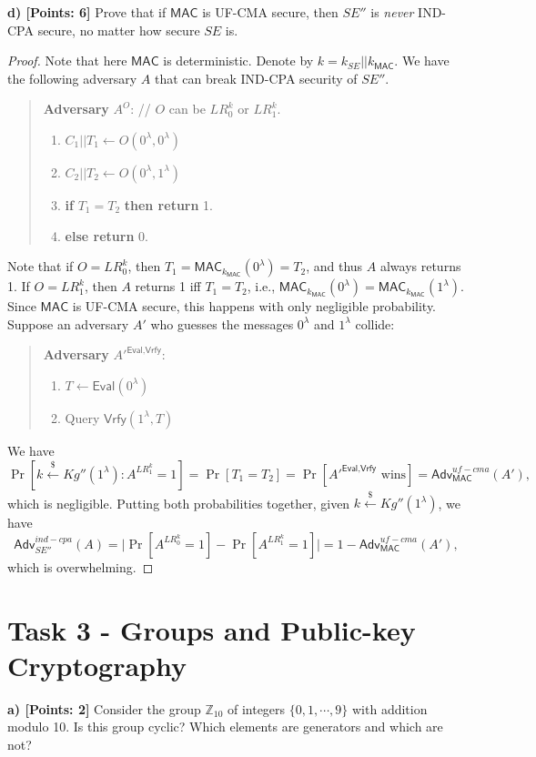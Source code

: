 \documentclass[12pt]{article}
\newcommand{\Z}{\mathbb{Z}}
\newcommand{\getsr}{\stackrel{\$}{\gets}}
\newcommand{\Adv}{\textsf{Adv}}
\newcommand{\MAC}{\textsf{MAC}}
\newcommand{\Eval}{\textsf{Eval}}
\newcommand{\Vrfy}{\textsf{Vrfy}}
\theoremstyle{definition}
\begin{document}
{\bf d) [Points: 6]} Prove that if $\MAC$ is UF-CMA secure, then $SE''$ is {\it never} IND-CPA secure, no matter how secure $SE$ is.
\begin{proof}
Note that here $\MAC$ is deterministic. Denote by $k = k_{SE}||k_{\MAC}$. We have the following adversary $A$ that can break IND-CPA security of $SE''$.
\begin{quote}
{\bf Adversary} $A^O$: // $O$ can be $LR_0^k$ or $LR_1^k$.
\begin{enumerate}
\item $C_1 || T_1 \gets O(0^\lambda, 0^\lambda)$
\item $C_2 || T_2 \gets O(0^\lambda, 1^\lambda)$
\item {\bf if} $T_1 = T_2$ {\bf then return} 1.
\item {\bf else return} 0.
\end{enumerate}
\end{quote}
Note that if $O = LR_0^k$, then $T_1 = \MAC_{k_{\MAC}}(0^\lambda) = T_2$, and thus $A$ always returns 1. If $O = LR_1^k$, then $A$ returns 1 iff $T_1 = T_2$, i.e., $\MAC_{k_{\MAC}}(0^\lambda) = \MAC_{k_{\MAC}}(1^\lambda)$. Since $\MAC$ is UF-CMA secure, this happens with only negligible probability. Suppose an adversary $A'$ who guesses the messages $0^\lambda$ and $1^\lambda$ collide:
\begin{quote}
{\bf Adversary} $A'^{\Eval, \Vrfy}$:
\begin{enumerate}
\item $T \gets \textsf{Eval}(0^\lambda)$
\item Query $\textsf{Vrfy}(1^\lambda, T)$
\end{enumerate}
\end{quote}
We have
$$\Pr[k \getsr Kg''(1^\lambda) : A^{LR_1^k}=1] = \Pr[T_1 = T_2] =  \Pr[\textrm{$A'^{\Eval, \Vrfy}$ wins}] = \Adv_{\MAC}^{uf-cma}(A'),$$
which is negligible. Putting both probabilities together, given $k \getsr Kg''(1^\lambda)$, we have 
$$\Adv_{SE''}^{ind-cpa}(A) = \bigg| \Pr[A^{LR_0^k}=1] -\Pr[A^{LR_1^k}=1] \bigg| = 1 - \Adv_{\MAC}^{uf-cma}(A'),$$
which is overwhelming.
\end{proof}

\section{Task 3 - Groups and Public-key Cryptography}

{\bf a) [Points: 2]} Consider the group $\Z_{10}$ of integers $\{0, 1, \cdots, 9\}$ with addition modulo 10. Is this group cyclic? Which elements are generators and which are not?
\end{document}
